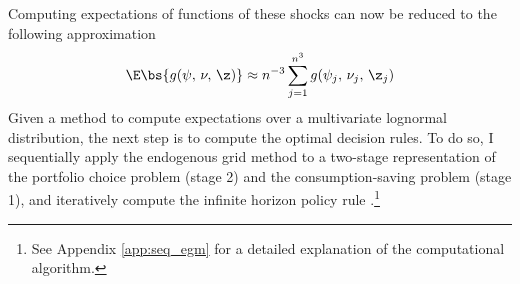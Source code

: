 Computing expectations of functions of these shocks can now be reduced to the following approximation
\[
\E\bs{g(\psi,\,\nu,\,\z)} \approx n^{-3}\sum_{j=1}^{n^3}g(\psi_j,\,\nu_j,\,\z_j)
\]
Given a method to compute expectations over a multivariate lognormal distribution, the next step is to compute the optimal decision rules. To do so, I sequentially apply the endogenous grid method to a two-stage representation of the portfolio choice problem (stage 2) and the consumption-saving problem (stage 1), and iteratively compute the infinite horizon policy rule \citep{Carroll2006, Carroll2024}.\footnote{See Appendix \ref{app:seq_egm} for a detailed explanation of the computational algorithm.}